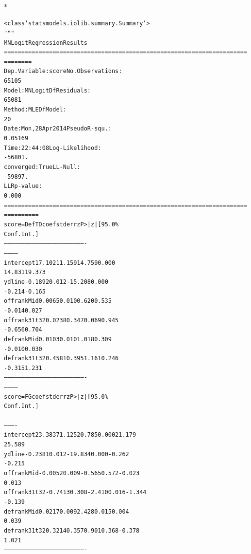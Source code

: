 \documentclass[letterpaper,10pt,english]{/anaconda/lib/python2.7/site-packages/sphinx/texinputs/sphinxhowto}
\def\smaller{\fontsize{9.5pt}{9.5pt}\selectfont}
\newenvironment{InvisibleVerbatim}
        {\begin{mdframed}[leftmargin=0.1\linewidth,innerleftmargin=3pt,innerrightmargin=3pt, userdefinedwidth=1\linewidth, linewidth=0pt, linecolor=white, usetwoside=false]}
        {\end{mdframed}}
\begin{document}
                \makebox[0.1\linewidth]{\smaller\hfill\tt\color{nbframe-out-prompt}Out\hspace{4pt}{[}13{]}:\hspace{4pt}}\\*
                \vspace{-2.55\baselineskip}\begin{InvisibleVerbatim}
                \vspace{-0.5\baselineskip}
\begin{alltt}<class 'statsmodels.iolib.summary.Summary'>
"""
                          MNLogit Regression Results
======================================================================
========
Dep. Variable:                  score   No. Observations:
65105
Model:                        MNLogit   Df Residuals:
65081
Method:                           MLE   Df Model:
20
Date:                Mon, 28 Apr 2014   Pseudo R-squ.:
0.05169
Time:                        22:44:08   Log-Likelihood:
-56801.
converged:                       True   LL-Null:
-59897.
                                        LLR p-value:
0.000
======================================================================
==========
   score=DefTD       coef    std err          z      P>|z|      [95.0\%
Conf. Int.]
----------------------------------------------------------------------
------------
intercept         17.1021      1.159     14.759      0.000
14.831    19.373
ydline            -0.1892      0.012    -15.208      0.000
-0.214    -0.165
offrankMid         0.0065      0.010      0.620      0.535
-0.014     0.027
offrank31t32       0.0238      0.347      0.069      0.945
-0.656     0.704
defrankMid         0.0103      0.010      1.018      0.309
-0.010     0.030
defrank31t32       0.4581      0.395      1.161      0.246
-0.315     1.231
----------------------------------------------------------------------
------------
    score=FG       coef    std err          z      P>|z|      [95.0\%
Conf. Int.]
----------------------------------------------------------------------
----------
intercept       23.3837      1.125     20.785      0.000        21.179
25.589
ydline          -0.2381      0.012    -19.834      0.000        -0.262
-0.215
offrankMid      -0.0052      0.009     -0.565      0.572        -0.023
0.013
offrank31t32    -0.7413      0.308     -2.410      0.016        -1.344
-0.139
defrankMid       0.0217      0.009      2.428      0.015         0.004
0.039
defrank31t32     0.3214      0.357      0.901      0.368        -0.378
1.021
----------------------------------------------------------------------

\end{alltt}
\end{InvisibleVerbatim}
\end{document}
